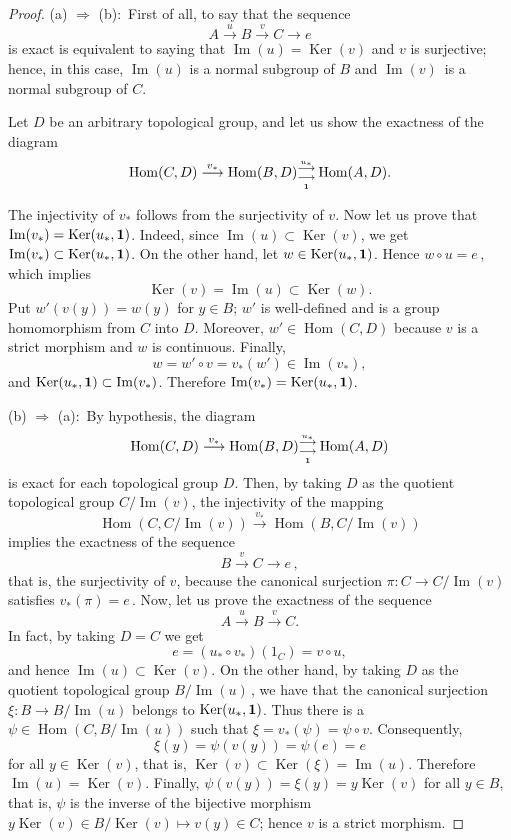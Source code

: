\documentclass[10pt,a4paper]{amsart}
\def\Hom{\operatorname{{Hom}}}
\def\Ker{\operatorname{{Ker}}}
\def\mI{\operatorname{{Im}}}
\begin{document}
\begin{proof}
(a) $\Rightarrow$ (b):\, First of all, to say that the sequence
$$
A \overset{u}{\longrightarrow} B \overset{v}{\longrightarrow} C \longrightarrow e
$$
is exact is equivalent to saying that $\mI(u) = \Ker(v)$ and $v$ is
surjective; hence, in this case, $\mI(u)$ is a normal subgroup of $B$
and $\mI(v)$\,  is a normal subgroup of $C$.

Let $D$ be an arbitrary topological group, and let us show the exactness
of the diagram
$$
\Hom(C,D) \overset{v_*}{\longrightarrow} \Hom(B,D)^{\overset{u_*}{\longrightarrow}}_{\underset{\bf 1}{\longrightarrow}} \Hom(A,D).
$$

The injectivity of $v_*$ follows from the surjectivity of $v$.
Now let us prove that $\mI(v_*) = \Ker(u_*,{\bf 1})$.
Indeed, since $\mI(u) \subset \Ker(v)$, we get
$\mI(v_*) \subset \Ker(u_*,\bf 1)$. On the other hand, let
$w \in \Ker(u_*,\bf 1)$. Hence $w \circ u = e$\,, which implies
$$
\Ker(v) = \mI(u) \subset \Ker(w).
$$
Put $w'(v(y)) = w(y)$ for $y \in B$; $w'$ is well-defined and is a group
homomorphism from $C$ into $D$. Moreover, $w' \in \Hom(C,D)$ because $v$
is a strict morphism and $w$ is continuous. Finally,
$$
w = w' \circ v = v_*(w') \in \mI(v_*),
$$
and $\Ker(u_*,{\bf 1}) \subset \mI(v_*)$. Therefore
$\mI(v_*) = \Ker(u_*,\bf 1)$.

\smallskip

\noindent (b) $\Rightarrow$ (a):\, By hypothesis, the diagram
$$
\Hom(C,D) \overset{v_*}{\longrightarrow} \Hom(B,D){}^{\overset{u_*}{\longrightarrow}}_{\underset{\bf 1}{\longrightarrow}} \Hom(A,D)
$$
is exact for each topological group $D$. Then, by taking $D$ as the quotient
topological group $C/\mI(v)$, the injectivity of the mapping
$$
\Hom(C,C/\mI(v)) \overset{v_*}{\longrightarrow} \Hom(B, C/\mI(v))
$$
implies the exactness of the sequence
$$
B \overset{v}{\longrightarrow} C \longrightarrow e\,,
$$
that is, the surjectivity of $v$, because the canonical surjection
$\pi\colon C \to C/\mI(v)$ satisfies $v_*(\pi) = e$\,. Now, let us prove
the exactness of the sequence
$$
A \overset{u}{\longrightarrow} B \overset{v}{\longrightarrow} C.
$$
In fact, by taking $D = C$ we get
$$
e = (u_* \circ v_*)(1_C) = v \circ u,
$$
and hence $\mI(u) \subset \Ker(v)$. On the other hand, by taking $D$ as the
quotient topological group $B/\mI(u)$\,, we have that the canonical
surjection $\xi\colon B \to B/\mI(u)$ belongs to $\Ker(u_*,{\bf 1})$.
Thus there is a $\psi \in \Hom(C, B/\mI(u))$ such that
$\xi = v_*(\psi) = \psi \circ v$. Consequently,
$$
\xi(y) = \psi(v(y)) = \psi(e) = e
$$
for all $y \in \Ker(v)$, that is, $\Ker(v) \subset \Ker(\xi) = \mI(u)$.
Therefore $\mI(u) = \Ker(v)$. Finally, $\psi(v(y)) = \xi(y) = y\Ker(v)$
for all $y \in B$, that is, $\psi$ is the inverse of the bijective morphism
$y\Ker(v) \in B/\Ker(v) \mapsto v(y) \in C$; hence $v$ is a strict morphism.
\end{proof}
\end{document}
